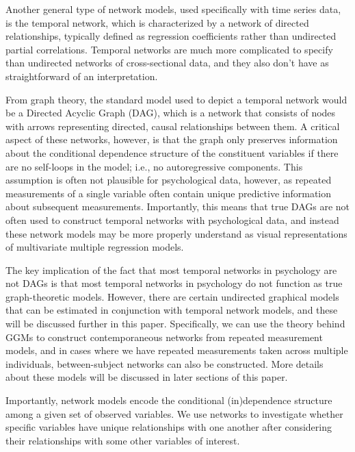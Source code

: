 Another general type of network models, used specifically with time series data, is the temporal network, which is characterized by a network of directed relationships, typically defined as regression coefficients rather than undirected partial correlations. Temporal networks are much more complicated to specify than undirected networks of cross-sectional data, and they also don’t have as straightforward of an interpretation. 

From graph theory, the standard model used to depict a temporal network would be a Directed Acyclic Graph (DAG), which is a network that consists of nodes with arrows representing directed, causal relationships between them. A critical aspect of these networks, however, is that the graph only preserves information about the conditional dependence structure of the constituent variables if there are no self-loops in the model; i.e., no autoregressive components. This assumption is often not plausible for psychological data, however, as repeated measurements of a single variable often contain unique predictive information about subsequent measurements. Importantly, this means that true DAGs are not often used to construct temporal networks with psychological data, and instead these network models may be more properly understand as visual representations of multivariate multiple regression models. 

The key implication of the fact that most temporal networks in psychology are not DAGs is that most temporal networks in psychology do not function as true graph-theoretic models. However, there are certain undirected graphical models that can be estimated in conjunction with temporal network models, and these will be discussed further in this paper. Specifically, we can use the theory behind GGMs to construct contemporaneous networks from repeated measurement models, and in cases where we have repeated measurements taken across multiple individuals, between-subject networks can also be constructed. More details about these models will be discussed in later sections of this paper.

Importantly, network models encode the conditional (in)dependence structure among a given set of observed variables. We use networks to investigate whether specific variables have unique relationships with one another after considering their relationships with some other variables of interest.

